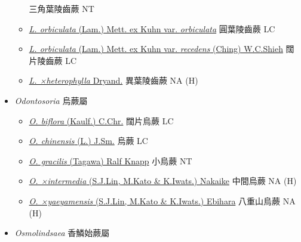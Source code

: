 \begin{itemize}
\begin{itemize}
                                        三角葉陵齒蕨   NT
        \item[] \href{http://www.theplantlist.org/tpl1.1/search?q=Lindsaea+orbiculata+var.+orbiculata}{\textit{L. orbiculata} (Lam.) Mett. ex Kuhn var. \textit{orbiculata}}  
                                        圓葉陵齒蕨   LC
        \item[] \href{http://www.theplantlist.org/tpl1.1/search?q=Lindsaea+orbiculata+var.+recedens}{\textit{L. orbiculata} (Lam.) Mett. ex Kuhn var. \textit{recedens} (Ching) W.C.Shieh}  
                                        闊片陵齒蕨   LC
        \item[] \href{http://www.theplantlist.org/tpl1.1/search?q=Lindsaea+×heterophylla}{\textit{L. ×heterophylla} Dryand.}   異葉陵齒蕨   NA (H)
  \end{itemize}
 \item[    ] \textit{Odontosoria} 烏蕨屬
                                
  \begin{itemize}
        \item[] \href{http://www.theplantlist.org/tpl1.1/search?q=Odontosoria+biflora}{\textit{O. biflora} (Kaulf.) C.Chr.}   闊片烏蕨   LC
        \item[] \href{http://www.theplantlist.org/tpl1.1/search?q=Odontosoria+chinensis}{\textit{O. chinensis} (L.) J.Sm.}   烏蕨   LC
        \item[] \href{http://www.theplantlist.org/tpl1.1/search?q=Odontosoria+gracilis}{\textit{O. gracilis} (Tagawa) Ralf Knapp}   小烏蕨   NT
        \item[] \href{http://www.theplantlist.org/tpl1.1/search?q=Odontosoria+×intermedia}{\textit{O. ×intermedia} (S.J.Lin, M.Kato \& K.Iwats.) Nakaike}   中間烏蕨   NA (H)
        \item[] \href{http://www.theplantlist.org/tpl1.1/search?q=Odontosoria+×yaeyamensis}{\textit{O. ×yaeyamensis} (S.J.Lin, M.Kato \& K.Iwats.) Ebihara}   八重山烏蕨   NA (H)
  \end{itemize}
 \item[    ] \textit{Osmolindsaea} 香鱗始蕨屬
                                

\end{itemize}
